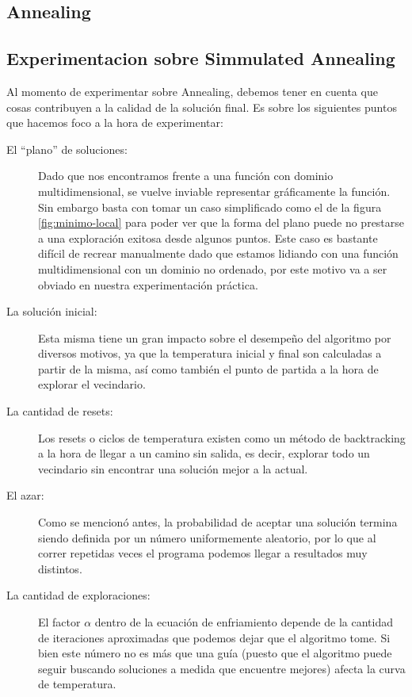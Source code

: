 \subsection{Annealing}

\subsection{Experimentacion sobre Simmulated Annealing}

Al momento de experimentar sobre Annealing, debemos tener en cuenta que cosas contribuyen a la calidad de la solución final. Es sobre los siguientes puntos que hacemos foco a la hora de experimentar:

\begin{description}
\item[El “plano” de soluciones:] Dado que nos encontramos frente a una función con dominio multidimensional, se vuelve inviable representar gráficamente la función. Sin embargo basta con tomar un caso simplificado como el de la figura \ref{fig:minimo-local} para poder ver que la forma del plano puede no prestarse a una exploración exitosa desde algunos puntos. Este caso es bastante difícil de recrear manualmente dado que estamos lidiando con una función multidimensional con un dominio no ordenado, por este motivo va a ser obviado en nuestra experimentación práctica.

\item[La solución inicial:] Esta misma tiene un gran impacto sobre el desempeño del algoritmo por diversos motivos, ya que la temperatura inicial y final son calculadas a partir de la misma, así como también el punto de partida a la hora de explorar el vecindario. 

\item[La cantidad de resets:] Los resets o ciclos de temperatura existen como un método de backtracking a la hora de llegar a un camino sin salida, es decir, explorar todo un vecindario sin encontrar una solución mejor a la actual.

\item[El azar:] Como se mencionó antes, la probabilidad de aceptar una solución termina siendo definida por un número uniformemente aleatorio, por lo que al correr repetidas veces el programa podemos llegar a resultados muy distintos.

\item[La cantidad de exploraciones:] El factor $\alpha$ dentro de la ecuación de enfriamiento depende de la cantidad de iteraciones aproximadas que podemos dejar que el algoritmo tome. Si bien este número no es más que una guía (puesto que el algoritmo puede seguir buscando soluciones a medida que encuentre mejores) afecta la curva de temperatura. 

\end{description}
